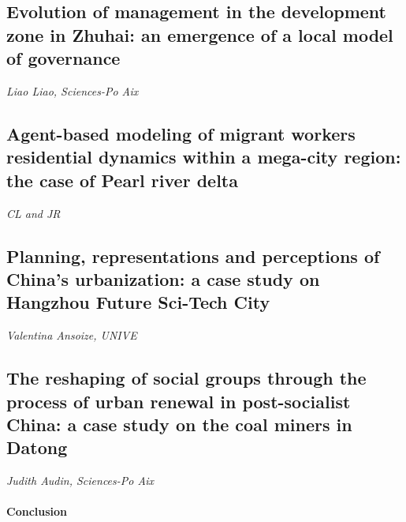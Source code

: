 \subsection*{Evolution of management in the development zone in Zhuhai: an emergence of a local model of governance}

\textit{Liao Liao, Sciences-Po Aix}



\subsection*{Agent-based modeling of migrant workers residential dynamics within a mega-city region: the case of Pearl river delta}

\textit{CL and JR}



\subsection*{Planning, representations and perceptions of China’s urbanization: a case study on Hangzhou Future Sci-Tech City}

\textit{Valentina Ansoize, UNIVE}





\subsection*{The reshaping of social groups through the process of urban renewal in post-socialist China: a case study on the coal miners in Datong}

\textit{Judith Audin, Sciences-Po Aix}





\paragraph{Conclusion}







\newpage







